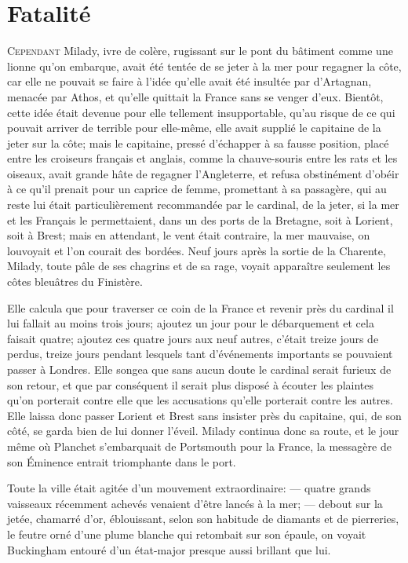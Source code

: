 
\chapter{Fatalité}

\lettrine{C}{ependant} Milady, ivre de colère, rugissant sur le pont du bâtiment comme une lionne qu'on embarque, avait été tentée de se jeter à la mer pour regagner la côte, car elle ne pouvait se faire à l'idée qu'elle avait été insultée par d'Artagnan, menacée par Athos, et qu'elle quittait la France sans se venger d'eux. Bientôt, cette idée était devenue pour elle tellement insupportable, qu'au risque de ce qui pouvait arriver de terrible pour elle-même, elle avait supplié le capitaine de la jeter sur la côte; mais le capitaine, pressé d'échapper à sa fausse position, placé entre les croiseurs français et anglais, comme la chauve-souris entre les rats et les oiseaux, avait grande hâte de regagner l'Angleterre, et refusa obstinément d'obéir à ce qu'il prenait pour un caprice de femme, promettant à sa passagère, qui au reste lui était particulièrement recommandée par le cardinal, de la jeter, si la mer et les Français le permettaient, dans un des ports de la Bretagne, soit à Lorient, soit à Brest; mais en attendant, le vent était contraire, la mer mauvaise, on louvoyait et l'on courait des bordées. Neuf jours après la sortie de la Charente, Milady, toute pâle de ses chagrins et de sa rage, voyait apparaître seulement les côtes bleuâtres du Finistère. 

Elle calcula que pour traverser ce coin de la France et revenir près du cardinal il lui fallait au moins trois jours; ajoutez un jour pour le débarquement et cela faisait quatre; ajoutez ces quatre jours aux neuf autres, c'était treize jours de perdus, treize jours pendant lesquels tant d'événements importants se pouvaient passer à Londres. Elle songea que sans aucun doute le cardinal serait furieux de son retour, et que par conséquent il serait plus disposé à écouter les plaintes qu'on porterait contre elle que les accusations qu'elle porterait contre les autres. Elle laissa donc passer Lorient et Brest sans insister près du capitaine, qui, de son côté, se garda bien de lui donner l'éveil. Milady continua donc sa route, et le jour même où Planchet s'embarquait de Portsmouth pour la France, la messagère de son Éminence entrait triomphante dans le port. 

Toute la ville était agitée d'un mouvement extraordinaire: --- quatre grands vaisseaux récemment achevés venaient d'être lancés à la mer; --- debout sur la jetée, chamarré d'or, éblouissant, selon son habitude de diamants et de pierreries, le feutre orné d'une plume blanche qui retombait sur son épaule, on voyait Buckingham entouré d'un état-major presque aussi brillant que lui. 


